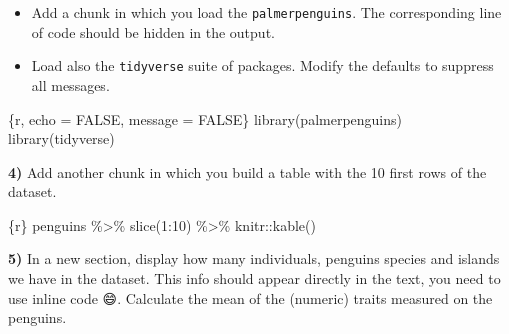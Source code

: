 \documentclass[
  letterpaper,
  DIV=11,
  numbers=noendperiod]{scrreprt}
\newenvironment{Shaded}{\begin{snugshade}}{\end{snugshade}}
\newcommand{\FunctionTok}[1]{\textcolor[rgb]{0.28,0.35,0.67}{#1}}
\newcommand{\InformationTok}[1]{\textcolor[rgb]{0.37,0.37,0.37}{#1}}
\newcommand{\NormalTok}[1]{\textcolor[rgb]{0.00,0.23,0.31}{#1}}
\providecommand{\tightlist}{%
  \setlength{\itemsep}{0pt}\setlength{\parskip}{0pt}}\usepackage{longtable,booktabs,array}
\begin{document}
\begin{itemize}
\tightlist
\item
  Add a chunk in which you load the \texttt{palmerpenguins}. The
  corresponding line of code should be hidden in the output.
\item
  Load also the \texttt{tidyverse} suite of packages. Modify the
  defaults to suppress all messages.
\end{itemize}

\begin{Shaded}
\begin{Highlighting}[]
\InformationTok{\textasciigrave{}\textasciigrave{}\textasciigrave{}\{r, echo = FALSE, message = FALSE\}}
\InformationTok{library(palmerpenguins)}
\InformationTok{library(tidyverse)}
\InformationTok{\textasciigrave{}\textasciigrave{}\textasciigrave{}}
\end{Highlighting}
\end{Shaded}

\textbf{4)} Add another chunk in which you build a table with the 10
first rows of the dataset.

\begin{Shaded}
\begin{Highlighting}[]
\InformationTok{\textasciigrave{}\textasciigrave{}\textasciigrave{}\{r\}}
\InformationTok{penguins \%\textgreater{}\%}
\InformationTok{  slice(1:10) \%\textgreater{}\%}
\InformationTok{  knitr::kable()}
\InformationTok{\textasciigrave{}\textasciigrave{}\textasciigrave{}}
\end{Highlighting}
\end{Shaded}

\textbf{5)} In a new section, display how many individuals, penguins
species and islands we have in the dataset. This info should appear
directly in the text, you need to use inline code 😄. Calculate the mean
of the (numeric) traits measured on the penguins.

\begin{Shaded}
\end{Shaded}
\end{document}
